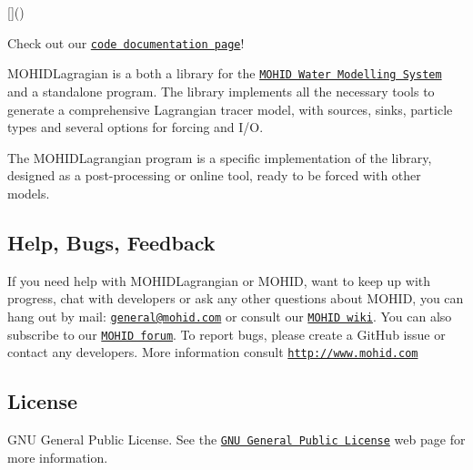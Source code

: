 \href{https://travis-ci.org/RBCanelas/MOHID-Lagrangian}{\tt }

\mbox{[}\mbox{]}()

Check out our \href{https://rbcanelas.github.io/MOHID-Lagrangian/}{\tt code documentation page}!

M\+O\+H\+I\+D\+Lagragian is a both a library for the \href{http://www.mohid.com}{\tt M\+O\+H\+ID Water Modelling System} and a standalone program. The library implements all the necessary tools to generate a comprehensive Lagrangian tracer model, with sources, sinks, particle types and several options for forcing and I/O.

The M\+O\+H\+I\+D\+Lagrangian program is a specific implementation of the library, designed as a post-\/processing or online tool, ready to be forced with other models.

\subsection*{Help, Bugs, Feedback}

If you need help with M\+O\+H\+I\+D\+Lagrangian or M\+O\+H\+ID, want to keep up with progress, chat with developers or ask any other questions about M\+O\+H\+ID, you can hang out by mail\+: \href{mailto:general@mohid.com}{\tt general@mohid.\+com} or consult our \href{http://wiki.mohid.com}{\tt M\+O\+H\+ID wiki}. You can also subscribe to our \href{http://forum.mohid.com}{\tt M\+O\+H\+ID forum}. To report bugs, please create a Git\+Hub issue or contact any developers. More information consult \href{http://www.mohid.com}{\tt http\+://www.\+mohid.\+com}

\subsection*{License}

G\+NU General Public License. See the \href{http://www.gnu.org/copyleft/gpl.html}{\tt G\+NU General Public License} web page for more information. 